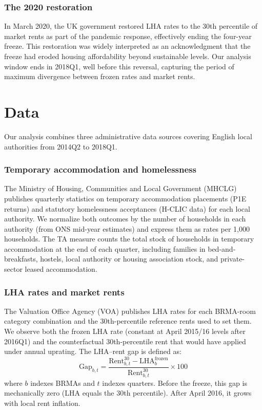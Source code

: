 \documentclass[12pt]{article}
\begin{document}
\subsubsection*{The 2020 restoration} In March 2020, the UK government restored LHA rates to the 30th percentile of market rents as part of the pandemic response, effectively ending the four-year freeze. This restoration was widely interpreted as an acknowledgment that the freeze had eroded housing affordability beyond sustainable levels. Our analysis window ends in 2018Q1, well before this reversal, capturing the period of maximum divergence between frozen rates and market rents.


\section{Data}

Our analysis combines three administrative data sources covering English local authorities from 2014Q2 to 2018Q1.

\subsubsection*{Temporary accommodation and homelessness} The Ministry of Housing, Communities and Local Government (MHCLG) publishes quarterly statistics on temporary accommodation placements (P1E returns) and statutory homelessness acceptances (H-CLIC data) for each local authority. We normalize both outcomes by the number of households in each authority (from ONS mid-year estimates) and express them as rates per 1,000 households. The TA measure counts the total stock of households in temporary accommodation at the end of each quarter, including families in bed-and-breakfasts, hostels, local authority or housing association stock, and private-sector leased accommodation.

\subsubsection*{LHA rates and market rents} The Valuation Office Agency (VOA) publishes LHA rates for each BRMA-room category combination and the 30th-percentile reference rents used to set them. We observe both the frozen LHA rate (constant at April 2015/16 levels after 2016Q1) and the counterfactual 30th-percentile rent that would have applied under annual uprating. The LHA--rent gap is defined as:
\begin{equation}
\text{Gap}_{b,t} = \frac{\text{Rent}^{30}_{b,t} - \text{LHA}^{\text{frozen}}_{b}}{\text{Rent}^{30}_{b,t}} \times 100
\label{eq:gap}
\end{equation}
where $b$ indexes BRMAs and $t$ indexes quarters. Before the freeze, this gap is mechanically zero (LHA equals the 30th percentile). After April 2016, it grows with local rent inflation.
\end{document}

